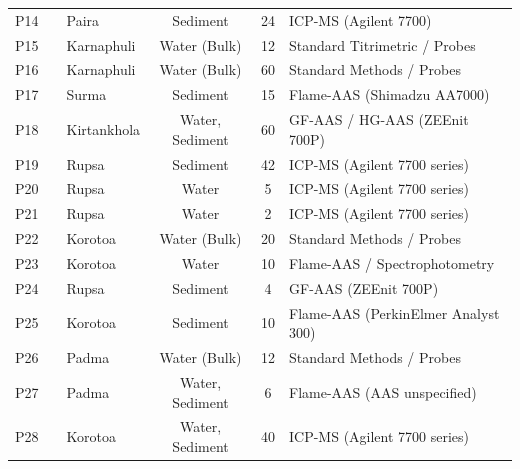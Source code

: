 \documentclass[authoryear,preprint,12pt]{elsarticle}
\begin{document}
\begin{table}[htbp]
{\begin{tabular}{lllccl}
P14 & \citet{Islam2017paira} & Paira & Sediment & 24 & ICP-MS (Agilent 7700) \\
P15 & \citet{Dey2017} & Karnaphuli & Water (Bulk) & 12 & Standard Titrimetric / Probes \\
P16 & \citet{Uddin2020} & Karnaphuli & Water (Bulk) & 60 & Standard Methods / Probes \\
P17 & \citet{Acharjee2022} & Surma & Sediment & 15 & Flame-AAS (Shimadzu AA7000) \\
P18 & \citet{Ali2021} & Kirtankhola & Water, Sediment & 60 & GF-AAS / HG-AAS (ZEEnit 700P) \\
P19 & \citet{Proshad2019} & Rupsa & Sediment & 42 & ICP-MS (Agilent 7700 series) \\
P20 & \citet{Proshad2021} & Rupsa & Water & 5 & ICP-MS (Agilent 7700 series) \\
P21 & \citet{Proshad2020} & Rupsa & Water & 2 & ICP-MS (Agilent 7700 series) \\
P22 & \citet{Islam2021kor} & Korotoa & Water (Bulk) & 20 & Standard Methods / Probes \\
P23 & \citet{Islam2022kor} & Korotoa & Water & 10 & Flame-AAS / Spectrophotometry \\
P24 & \citet{Kubra2022} & Rupsa & Sediment & 4 & GF-AAS (ZEEnit 700P) \\
P25 & \citet{Islam2017kor} & Korotoa & Sediment & 10 & Flame-AAS (PerkinElmer Analyst 300) \\
P26 & \citet{Haque2018} & Padma & Water (Bulk) & 12 & Standard Methods / Probes \\
P27 & \citet{Mortuza2024} & Padma & Water, Sediment & 6 & Flame-AAS (AAS unspecified) \\
P28 & \citet{Islam2015kor} & Korotoa & Water, Sediment & 40 & ICP-MS (Agilent 7700 series) \\
\bottomrule
\end{tabular}%
}
\end{table}
\end{document}
